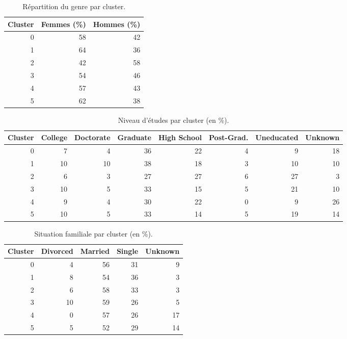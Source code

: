 \documentclass[11pt,a4paper]{article}
\begin{document}
\begin{table}[H]
\centering
\begin{tabular}{@{}rrr@{}}
\toprule
\textbf{Cluster} & \textbf{Femmes (\%)} & \textbf{Hommes (\%)}\\
\midrule
0 & 58 & 42\\
1 & 64 & 36\\
2 & 42 & 58\\
3 & 54 & 46\\
4 & 57 & 43\\
5 & 62 & 38\\
\bottomrule
\end{tabular}
\caption{Répartition du genre par cluster.}
\end{table}

\begin{table}[H]
\centering
\small
\begin{tabular}{@{}rrrrrrrr@{}}
\toprule
\textbf{Cluster} & College & Doctorate & Graduate & High School & Post-Grad. & Uneducated & Unknown\\
\midrule
0 & 7 & 4 & 36 & 22 & 4 & 9 & 18\\
1 & 10 & 10 & 38 & 18 & 3 & 10 & 10\\
2 & 6 & 3 & 27 & 27 & 6 & 27 & 3\\
3 & 10 & 5 & 33 & 15 & 5 & 21 & 10\\
4 & 9 & 4 & 30 & 22 & 0 & 9 & 26\\
5 & 10 & 5 & 33 & 14 & 5 & 19 & 14\\
\bottomrule
\end{tabular}
\caption{Niveau d'études par cluster (en \%).}
\end{table}

\begin{table}[H]
\centering
\begin{tabular}{@{}rrrrr@{}}
\toprule
\textbf{Cluster} & Divorced & Married & Single & Unknown\\
\midrule
0 & 4 & 56 & 31 & 9\\
1 & 8 & 54 & 36 & 3\\
2 & 6 & 58 & 33 & 3\\
3 & 10 & 59 & 26 & 5\\
4 & 0 & 57 & 26 & 17\\
5 & 5 & 52 & 29 & 14\\
\bottomrule
\end{tabular}
\caption{Situation familiale par cluster (en \%).}
\end{table}
\end{document}
